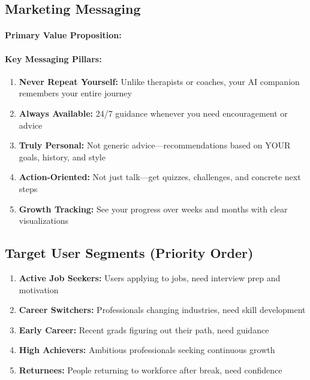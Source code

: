 \documentclass[12pt,a4paper]{article}
\begin{document}
\subsection{Marketing Messaging}

\paragraph{Primary Value Proposition:}
\begin{center}
\end{center}

\paragraph{Key Messaging Pillars:}
\begin{enumerate}
    \item \textbf{Never Repeat Yourself:} Unlike therapists or coaches, your AI companion remembers your entire journey
    \item \textbf{Always Available:} 24/7 guidance whenever you need encouragement or advice
    \item \textbf{Truly Personal:} Not generic advice—recommendations based on YOUR goals, history, and style
    \item \textbf{Action-Oriented:} Not just talk—get quizzes, challenges, and concrete next steps
    \item \textbf{Growth Tracking:} See your progress over weeks and months with clear visualizations
\end{enumerate}

\subsection{Target User Segments (Priority Order)}

\begin{enumerate}
    \item \textbf{Active Job Seekers:} Users applying to jobs, need interview prep and motivation
    \item \textbf{Career Switchers:} Professionals changing industries, need skill development
    \item \textbf{Early Career:} Recent grads figuring out their path, need guidance
    \item \textbf{High Achievers:} Ambitious professionals seeking continuous growth
    \item \textbf{Returnees:} People returning to workforce after break, need confidence
\end{enumerate}
\end{document}
